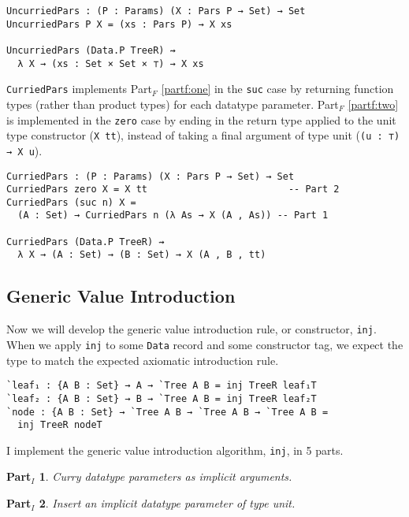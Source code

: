\documentclass[runningheads,a4paper]{llncs}
\newtheorem{myparti}{Part$_I$}
\newcommand{\refpartf}[1]{Part$_F$ \ref{partf:#1}}
\begin{document}
\begin{verbatim}
UncurriedPars : (P : Params) (X : Pars P → Set) → Set
UncurriedPars P X = (xs : Pars P) → X xs

UncurriedPars (Data.P TreeR) ⇝
  λ X → (xs : Set × Set × ⊤) → X xs
\end{verbatim}

{\tt CurriedPars} implements \refpartf{one} in the {\tt suc} case 
by returning function types (rather than product types) for each
datatype parameter.
\refpartf{two} is implemented in the {\tt zero} case by ending in the
return type applied to the unit type constructor ({\tt X tt}), instead
of taking a final argument of type unit ({\tt (u : ⊤) → X u}). 

\begin{verbatim}
CurriedPars : (P : Params) (X : Pars P → Set) → Set
CurriedPars zero X = X tt                         -- Part 2
CurriedPars (suc n) X =
  (A : Set) → CurriedPars n (λ As → X (A , As)) -- Part 1

CurriedPars (Data.P TreeR) ⇝
  λ X → (A : Set) → (B : Set) → X (A , B , tt)
\end{verbatim}

\subsection{Generic Value Introduction}

Now we will develop the generic value introduction rule, or
constructor, {\tt inj}. When we apply {\tt inj} to some
{\tt Data} record and some constructor tag, we expect the type to
match the expected axiomatic introduction rule.

\begin{verbatim}
`leaf₁ : {A B : Set} → A → `Tree A B = inj TreeR leaf₁T
`leaf₂ : {A B : Set} → B → `Tree A B = inj TreeR leaf₂T
`node : {A B : Set} → `Tree A B → `Tree A B → `Tree A B =
  inj TreeR nodeT
\end{verbatim}

I implement the generic value introduction algorithm, {\tt inj},
in 5 parts.

\begin{myparti}
\label{parti:one}
Curry datatype parameters as implicit arguments.
\end{myparti}

\begin{myparti}
\label{parti:two}
Insert an implicit datatype parameter of type unit.
\end{myparti}
\end{document}
